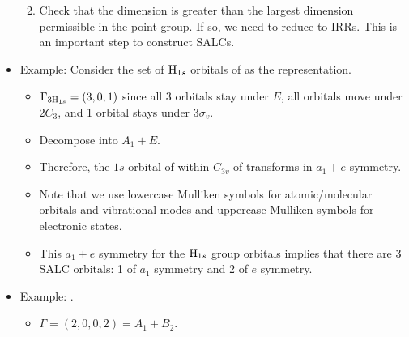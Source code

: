 \documentclass[../notes.tex]{subfiles}
\begin{document}
\begin{itemize}
\begin{enumerate}
\begin{itemize}
        \end{itemize}
        \item Check that the dimension is greater than the largest dimension permissible in the point group. If so, we need to reduce to IRRs. This is an important step to construct SALCs.
    \end{enumerate}
    \item Example: Consider the set of $\ce{H}_{1s}$ orbitals of  as the representation.
    \begin{itemize}
        \item $\Gamma_{3\ce{H}_{1s}}=(3,0,1)$ since all 3 orbitals stay under $E$, all orbitals move under $2C_3$, and 1 orbital stays under $3\sigma_v$.
        \item Decompose into $A_1+E$.
        \item Therefore, the $1s$ orbital of  within $C_{3v}$ of  transforms in $a_1+e$ symmetry.
        \item Note that we use lowercase Mulliken symbols for atomic/molecular orbitals and vibrational modes and uppercase Mulliken symbols for electronic states.
        \item This $a_1+e$ symmetry for the $\ce{H}_{1s}$ group orbitals implies that there are 3 SALC orbitals: 1 of $a_1$ symmetry and 2 of $e$ symmetry.
    \end{itemize}
    \item Example: .
    \begin{itemize}
        \item $\Gamma=(2,0,0,2)=A_1+B_2$.
    \end{itemize}
\end{itemize}
\end{document}
